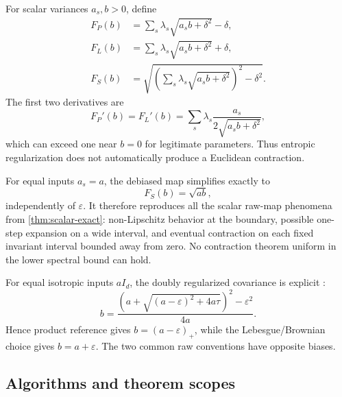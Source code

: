 \documentclass[11pt]{article}
\theoremstyle{definition}
\newcommand{\Id}{I_d}
\newcommand{\eps}{\varepsilon}
\begin{document}
For scalar variances $a_s,b>0$, define
\begin{align}
 F_P(b)&=\sum_s\lambda_s\sqrt{a_sb+\delta^2}-\delta,
 \label{eq:scalar-entropic-P}\\
 F_L(b)&=\sum_s\lambda_s\sqrt{a_sb+\delta^2}+\delta,
 \label{eq:scalar-entropic-L}\\
 F_S(b)&=\sqrt{\left(\sum_s\lambda_s
 \sqrt{a_sb+\delta^2}\right)^2-\delta^2}.
 \label{eq:scalar-entropic-S}
\end{align}
The first two derivatives are
\begin{equation}\label{eq:entropic-derivative}
 F_P'(b)=F_L'(b)=
 \sum_s\lambda_s\frac{a_s}{2\sqrt{a_sb+\delta^2}},
\end{equation}
which can exceed one near $b=0$ for legitimate parameters.  Thus entropic
regularization does not automatically produce a Euclidean contraction.

For equal inputs $a_s=a$, the debiased map simplifies exactly to
\begin{equation}\label{eq:equal-sinkhorn-scalar}
 F_S(b)=\sqrt{ab},
\end{equation}
independently of $\eps$.  It therefore reproduces all the scalar raw-map
phenomena from \cref{thm:scalar-exact}: non-Lipschitz behavior at the boundary,
possible one-step expansion on a wide interval, and eventual contraction on
each fixed invariant interval bounded away from zero.  No contraction theorem
uniform in the lower spectral bound can hold.

For equal isotropic inputs $a\Id$, the doubly regularized covariance is
explicit \cite{Chizat2025}:
\begin{equation}\label{eq:isotropic-double-reg}
 b=\frac{\left(a+\sqrt{(a-\eps)^2+4a\tau}\right)^2-\eps^2}{4a}.
\end{equation}
Hence product reference gives $b=(a-\eps)_+$, while the
Lebesgue/Brownian choice gives $b=a+\eps$.  The two common raw conventions
have opposite biases.

\subsection{Algorithms and theorem scopes}
\end{document}
